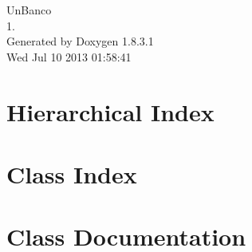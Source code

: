 \documentclass{article}
\begin{document}
\hypersetup{pageanchor=false,citecolor=blue}
\begin{titlepage}
\vspace*{7cm}
\begin{center}
{\Large Un\-Banco \\[1ex]\large 1. }\\
\vspace*{1cm}
{\large Generated by Doxygen 1.8.3.1}\\
\vspace*{0.5cm}
{\small Wed Jul 10 2013 01:58:41}\\
\end{center}
\end{titlepage}
\tableofcontents
{}
\hypersetup{pageanchor=true,citecolor=blue}
\section{Hierarchical Index}

\section{Class Index}

\section{Class Documentation}


































\printindex
\end{document}
